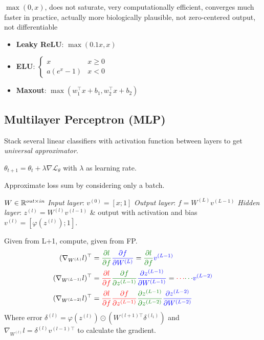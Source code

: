   \(\max(0, x)\), does not saturate, very computationally efficient, converges much faster in practice, actually more biologically plausible, not zero-centered output, not differentiable


\begin{itemize}
  \item \textbf{Leaky ReLU}: \(\max(0.1x, x)\)
  \item \textbf{ELU}: \(\begin{cases}
    x & x \geq 0 \\
    a(e^x - 1) & x < 0
  \end{cases}\) \\
  \item \textbf{Maxout}: \(\max(w_1^\top x + b_1, w_2^\top x + b_2)\)
\end{itemize}

\subsection*{Multilayer Perceptron (MLP)}
Stack several linear classifiers with activation function between layers to get \textit{universal approximator}.

  \(\theta_{t+1} = \theta_t + \lambda \nabla \mathcal{L}_\theta\) with \(\lambda\) as learning rate.


  Approximate loss sum by considering only a batch.


  \(W \in \mathbb{R}^{out \times in}\)
  \textit{Input layer}: \(v^{(0)} = [x; 1]\)
  \textit{Output layer}: \(f = W^{(L)}v^{(L-1)}\)
  \textit{Hidden layer}: \(z^{(l)} = W^{(l)}v^{(l-1)}\) \& output with activation and bias \(v^{(l)} = [\varphi(z^{(l)}); 1]\).


  
  \textcolor{H1}{Given from L+1}, \textcolor{H2}{compute}, \textcolor{H3}{given from FP}.
  \begin{align*}
    (\nabla_{W^{(L)}}l)^\top &=\textcolor{H2}{\frac{\partial l}{\partial f}}\textcolor{H3}{\frac{\partial f}{\partial W^{(L)}}} = \textcolor{H2}{\frac{\partial l}{\partial f}}\textcolor{H3}{v^{(L-1)}} \\
    (\nabla_{W^{(L-1)}}l)^\top &= \textcolor{H1}{\frac{\partial l}{\partial f}} \textcolor{H2}{\frac{\partial f}{\partial z^{(L-1)}}}\textcolor{H3}{\frac{\partial z^{(L-1)}}{\partial W^{(L-1)}}} = \textcolor{H1}{\cdots} \textcolor{H2}{\cdots}\textcolor{H3}{v^{(L-2)}}\\
    (\nabla_{W^{(L-2)}}l)^\top &= \textcolor{H1}{\frac{\partial l}{\partial f} \frac{\partial f}{\partial z^{(L-1)}}} \textcolor{H2}{\frac{\partial z^{(L-1)}}{\partial z^{(L-2)}}}\textcolor{H3}{\frac{\partial z^{(L-2)}}{\partial W^{(L-2)}}}
  \end{align*}
  Where error \(\delta^{(l)} = \varphi(z^{(l)}) \odot (W^{(l+1)\top} \delta^{(l_1)})\) and \\ \(\nabla_{W^{(l)}}l = \delta^{(l)}v^{(l-1)\top}\) to calculate the gradient.


